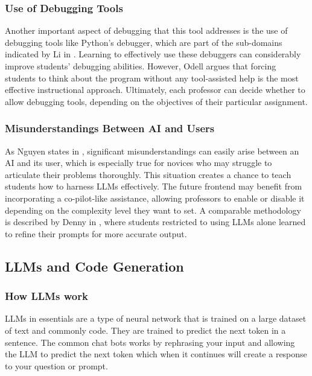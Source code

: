 \documentclass[12pt]{extarticle}
\begin{document}
\subsubsection{Use of Debugging Tools}

Another important aspect of debugging that this tool addresses is the use of debugging tools like Python’s debugger, which are part of the sub-domains indicated by Li in \cite{li2019}. Learning to effectively use these debuggers can considerably improve students’ debugging abilities. However, Odell \cite{odell2017} argues that forcing students to think about the program without any tool-assisted help is the most effective instructional approach. Ultimately, each professor can decide whether to allow debugging tools, depending on the objectives of their particular assignment.

\subsubsection{Misunderstandings Between AI and Users}

As Nguyen states in \cite{nguyen2024}, significant misunderstandings can easily arise between an AI and its user, which is especially true for novices who may struggle to articulate their problems thoroughly. This situation creates a chance to teach students how to harness LLMs effectively. The future frontend may benefit from incorporating a co-pilot-like assistance, allowing professors to enable or disable it depending on the complexity level they want to set. A comparable methodology is described by Denny in \cite{denny2023}, where students restricted to using LLMs alone learned to refine their prompts for more accurate output.

\subsection{LLMs and Code Generation}
\subsubsection{How LLMs work}

LLMs in essentials are a type of neural network that is trained on a large dataset of text and commonly code. They are trained to predict the next token in a sentence. The common chat bots works by rephrasing your input and allowing the LLM to predict the next token which when it continues will create a response to your question or prompt.
\end{document}
